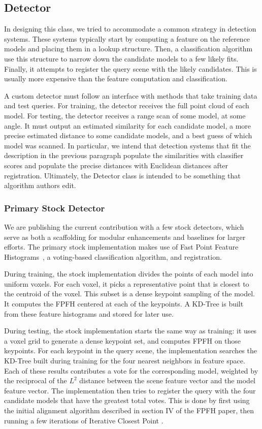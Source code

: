 \subsection{Detector}
In designing this class, we tried to accommodate a common strategy in detection systems.
These systems typically start by computing a feature on the reference models and placing them in a lookup structure.
Then, a classification algorithm use this structure to narrow down the candidate models to a few likely fits.
Finally, it attempts to register the query scene with the likely candidates. This is usually more expensive than the feature computation and classification.

A custom detector must follow an interface with methods that take training data and test queries.
For training, the detector receives the full point cloud of each model.
For testing, the detector receives a range scan of some model, at some angle. It must output an estimated similarity for each candidate model, a more precise estimated distance to some candidate models, and a best guess of which model was scanned.
In particular, we intend that detection systems that fit the description in the previous paragraph populate the similarities with classifier scores and populate the precise distances with Euclidean distances after registration.
Ultimately, the Detector class is intended to be something that algorithm authors edit.

\subsubsection{Primary Stock Detector}
We are publishing the current contribution with a few stock detectors, which serve as both a scaffolding for modular enhancements and baselines for larger efforts.
The primary stock implementation makes use of Fast Point Feature Histograms~\cite{fpfh1, fpfh2}, a voting-based classification algorithm, and registration.

During training, the stock implementation divides the points of each model into uniform voxels. For each voxel, it picks a representative point that is closest to the centroid of the voxel. This subset is a dense keypoint sampling of the model. It computes the FPFH centered at each of the keypoints. A KD-Tree is built from these feature histograms and stored for later use.

During testing, the stock implementation starts the same way as training: it uses a voxel grid to generate a dense keypoint set, and computes FPFH on those keypoints.
For each keypoint in the query scene, the implementation searches the KD-Tree built during training for the four nearest neighbors in feature space. Each of these results contributes a vote for the corresponding model, weighted by the reciprocal of the $L^2$ distance between the scene feature vector and the model feature vector.
The implementation then tries to register the query with the four candidate models that have the greatest total votes.
This is done by first using the initial alignment algorithm described in section IV of the FPFH paper, then running a few iterations of Iterative Closest Point \cite{BeslMcKay}.

